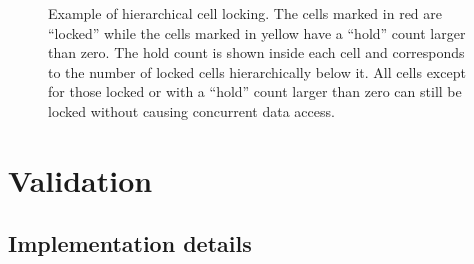 \documentclass[final]{siamltex}
\begin{document}
\begin{figure}
    \centerline{}
    
    \caption{Example of hierarchical cell locking. The cells marked in red
        are ``locked'' while the cells marked in yellow have a ``hold'' count
        larger than zero.
        The hold count is shown inside each cell and corresponds to the number
        of locked cells hierarchically below it.
        All cells except for those locked or with a ``hold'' count larger than
        zero can still be locked without causing concurrent data access.
        }
    \label{fig:CellLocking}
\end{figure}


\section{Validation}

\subsection{Implementation details}
\end{document}
